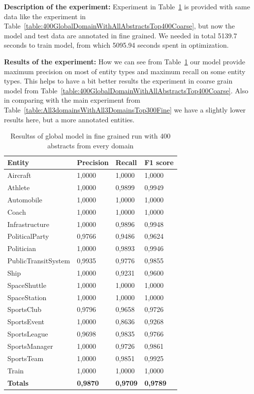 \documentclass[thesis=M,english]{FITthesis}[2018/05/30]
\begin{document}

\textbf{Description of the experiment:} Experiment in Table~\ref{table:400GlobalDomainWithAllAbstractsTop400Fine} is provided with same data like the experiment in Table~\ref{table:400GlobalDomainWithAllAbstractsTop400Coarse}, but now the model and test data are annotated in fine grained. We needed in total 5139.7 seconds to train model, from which 5095.94 seconds spent in optimization.

\textbf{Results of the experiment:} How we can see from Table~\ref{table:400GlobalDomainWithAllAbstractsTop400Fine} our model provide maximum precision on most of entity types and maximum recall on some entity types. This helps to have a bit better results the experiment in coarse grain model from Table~\ref{table:400GlobalDomainWithAllAbstractsTop400Coarse}. Also in comparing with the main experiment from Table~\ref{table:All3domainsWithAll3DomainsTop300Fine} we have a slightly lower results here, but a more annotated entities.


	\begin{table}[H]\centering
		\begin{tabular}{|l|l|l|l|}
			\hline {\textbf{Entity}} & {\textbf{Precision}} & {\textbf{Recall}} & {\textbf{F1 score}}\\\hline
				Aircraft & 1,0000 & 1,0000 & 1,0000\\
				Athlete & 1,0000 & 0,9899 & 0,9949\\
				Automobile & 1,0000 & 1,0000 & 1,0000\\ 
				Coach & 1,0000 & 1,0000 & 1,0000\\
				Infrastructure & 1,0000 & 0,9896 & 0,9948\\
				PoliticalParty & 0,9766 & 0,9486 & 0,9624\\
				Politician & 1,0000 & 0,9893 & 0,9946\\
				PublicTransitSystem & 0,9935 & 0,9776 & 0,9855\\
				Ship & 1,0000 & 0,9231 & 0,9600\\
				SpaceShuttle & 1,0000 & 1,0000 & 1,0000\\
				SpaceStation & 1,0000 & 1,0000 & 1,0000\\ 
				SportsClub & 0,9796 & 0,9658 & 0,9726\\
				SportsEvent & 1,0000 & 0,8636 & 0,9268\\
				SportsLeague & 0,9698 & 0,9835 & 0,9766\\
				SportsManager & 1,0000 & 0,9726 & 0,9861\\
				SportsTeam & 1,0000 & 0,9851 & 0,9925\\
				Train & 1,0000 & 1,0000 & 1,0000\\\hline
				\textbf{Totals} & \textbf{0,9870} & \textbf{0,9709} & \textbf{0,9789}\\\hline
		\end{tabular}
		\caption{Resultss of global model in fine grained run with 400 abstracts from every domain \label{table:400GlobalDomainWithAllAbstractsTop400Fine}}
	\end{table}
\end{document}
